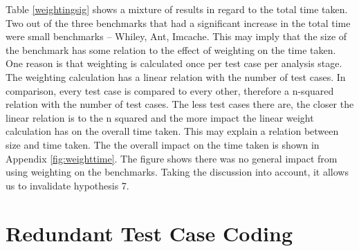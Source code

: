 Table \ref{weightingsig} shows a mixture of results in regard to the total time taken. Two out of the three benchmarks that had a significant increase in the total time were small benchmarks -- Whiley, Ant, Imcache. This may imply that the size of the benchmark has some relation to the effect of weighting on the time taken. One reason is that weighting is calculated once per test case per analysis stage. The weighting calculation has a linear relation with the number of test cases. In comparison, every test case is compared to every other, therefore a n-squared relation with the number of test cases. The less test cases there are, the closer the linear relation is to the n squared and the more impact the linear weight calculation has on the overall time taken. This may explain a relation between size and time taken. The the overall impact on the time taken is shown in Appendix \ref{fig:weighttime}. The figure shows there was no general impact from using weighting on the benchmarks. Taking the discussion into account, it allows us to invalidate hypothesis 7.

\section{Redundant Test Case Coding}


